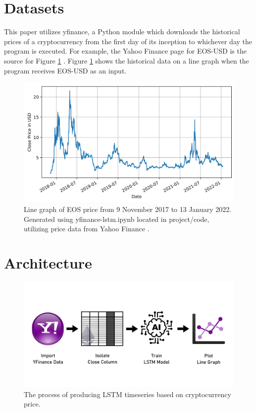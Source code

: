\section{Datasets}

This paper utilizes yfinance, a Python module which downloads the
historical prices of a cryptocurrency from the first day of its
inception to whichever day the program is executed. For example, the
Yahoo Finance page for EOS-USD is the source for Figure
\ref{fig:eos-price} \cite{c4}. Figure \ref{fig:eos-price} shows the
historical data on a line graph when the program receives EOS-USD as
an input.

\begin{figure}[htb]
\includegraphics[width=\columnwidth]{images/EOS-USD-price.png}


\caption{Line graph of EOS price from 9 November 2017 to 13 January
  2022. Generated using yfinance-lstm.ipynb \cite{c13} located in
  project/code, utilizing price data from Yahoo Finance \cite{c4}.}

\label{fig:eos-price}
\end{figure}

\section{Architecture}

\begin{figure}[htb]
\includegraphics[width=\columnwidth]{images/architecture-process.png}
\caption{The process of producing LSTM timeseries based on cryptocurrency price.}
\label{fig:arch-process}
\end{figure}


